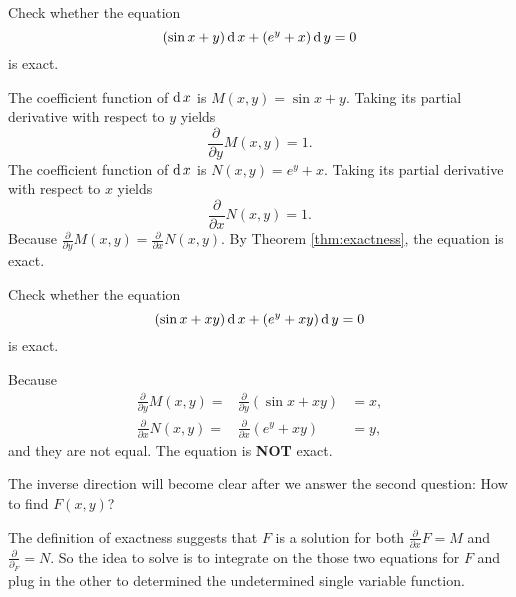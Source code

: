 
\begin{example}
	Check whether the equation 
	\[(\sin x +y)\operatorname{d} x + ( e^y +x)\operatorname{d} y=0\]
	is exact.
\end{example}
\begin{solution}
  The coefficient function of $\operatorname{d} x$ is $M(x,y)=\sin x+ y$. Taking its partial derivative with respect to $y$ yields
  \[\frac{\partial}{\partial y} M(x,y)=1.\]
  The coefficient function of $\operatorname{d} x$ is $N(x,y)= e^y+x$. Taking its partial derivative with respect to $x$ yields
  \[\frac{\partial}{\partial x} N(x,y)=1.\]
  Because $\frac{\partial}{\partial y} M(x,y)=\frac{\partial}{\partial x} N(x,y)$. By Theorem \ref{thm:exactness}, the equation is exact.
\end{solution}

\begin{exercise}
	Check whether the equation 
	\[ ( \sin x +xy)\operatorname{d} x + ( e^y +xy)\operatorname{d} y=0 \]
	is exact.
\end{exercise}
\begin{exersol}
Because  
	\[
	\begin{aligned}
    \frac{\partial}{\partial y} M(x, y)=&\frac{\partial}{\partial y} (\sin x+ xy)&= x,\\
	\frac{\partial}{\partial x} N(x, y)=&\frac{\partial}{\partial x} (e^y+xy)&= y,
	\end{aligned}
	\]
	and they are not equal. The equation is \textbf{NOT} exact.
\end{exersol}

The inverse direction will become clear after we answer the second question: How to find $F(x, y)$?

The definition of exactness suggests that $F$ is a solution for both $\frac{\partial}{\partial x} F = M$ and $\frac{\partial}{\partial_ F} =N$. So the idea to solve is to integrate on the those two equations for $F$ and plug in the other to determined the undetermined single variable function.

